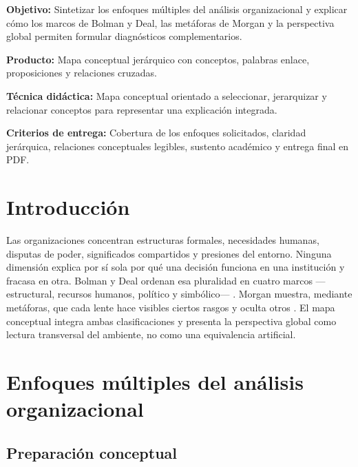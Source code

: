 \documentclass[spanish,letterpaper,oneside]{article}
\begin{document}
\templatePortrait
\templatePagecfg
\onehalfspacing

\begin{abstractd}
\textbf{Objetivo:} Sintetizar los enfoques múltiples del análisis organizacional y explicar cómo los marcos de Bolman y Deal, las metáforas de Morgan y la perspectiva global permiten formular diagnósticos complementarios.

\textbf{Producto:} Mapa conceptual jerárquico con conceptos, palabras enlace, proposiciones y relaciones cruzadas.

\textbf{Técnica didáctica:} Mapa conceptual orientado a seleccionar, jerarquizar y relacionar conceptos para representar una explicación integrada.

\textbf{Criterios de entrega:} Cobertura de los enfoques solicitados, claridad jerárquica, relaciones conceptuales legibles, sustento académico y entrega final en PDF.
\end{abstractd}

\templateIndex
\templateFinalcfg

\section{Introducción}

Las organizaciones concentran estructuras formales, necesidades humanas, disputas de poder, significados compartidos y presiones del entorno. Ninguna dimensión explica por sí sola por qué una decisión funciona en una institución y fracasa en otra. Bolman y Deal ordenan esa pluralidad en cuatro marcos ---estructural, recursos humanos, político y simbólico--- \citep{bolmanDeal2021}. Morgan muestra, mediante metáforas, que cada lente hace visibles ciertos rasgos y oculta otros \citep{morgan2006}. El mapa conceptual integra ambas clasificaciones y presenta la perspectiva global como lectura transversal del ambiente, no como una equivalencia artificial.

\section{Enfoques múltiples del análisis organizacional}

\subsection{Preparación conceptual}
\end{document}
